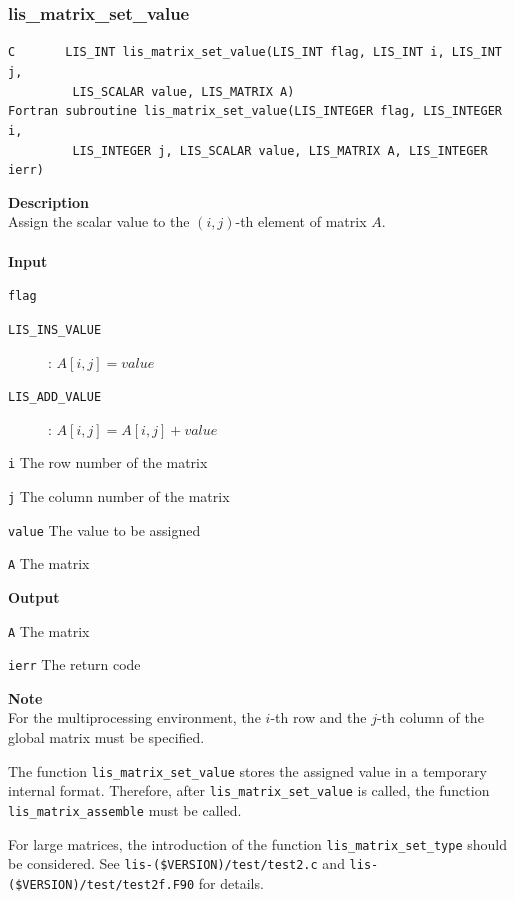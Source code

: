 \documentclass[a4paper]{article}
\newcommand{\namelistlabel}[1]{\mbox{#1}\hfill}
\newenvironment{namelist}[1]{%
\begin{list}{}
  {\let\makelabel\namelistlabel
  \settowidth{\labelwidth}{#1}
  \setlength{\leftmargin}{1.1\labelwidth}}
  }{%
\end{list}}
\begin{document}
\subsubsection{lis\_matrix\_set\_value}
\begin{screen}
\verb|C       LIS_INT lis_matrix_set_value(LIS_INT flag, LIS_INT i, LIS_INT j,|\\
\verb|         LIS_SCALAR value, LIS_MATRIX A)|\\
\verb|Fortran subroutine lis_matrix_set_value(LIS_INTEGER flag, LIS_INTEGER i,|\\
\verb|         LIS_INTEGER j, LIS_SCALAR value, LIS_MATRIX A, LIS_INTEGER ierr)|
\end{screen}
{\bf Description}\\
\indent
Assign the scalar value to the $(i, j)$-th element of matrix $A$.
\\ \\
\noindent
{\bf Input}
\begin{namelist}{XXXXXXXXXXXXXXXXXXXX}
\item[\tt flag] \begin{description}
\item[\tt LIS\_INS\_VALUE]: $A[i,j] = value$
\item[\tt LIS\_ADD\_VALUE]: $A[i,j] = A[i,j] + value$
\end{description}
\item[\tt i] The row number of the matrix
\item[\tt j] The column number of the matrix
\item[\tt value] The value to be assigned
\item[\tt A] The matrix
\end{namelist}
{\bf Output}
\begin{namelist}{XXXXXXXXXXXXXXXXXXXX}
\item[\tt A] The matrix 
\item[\tt ierr] The return code
\end{namelist}
\noindent
{\bf Note}\\
\indent
For the multiprocessing environment, the $i$-th row and the $j$-th column of the global matrix must 
be specified. 

The function \verb|lis_matrix_set_value| stores the assigned value in a temporary internal format. 
Therefore, after \verb|lis_matrix_set_value| is called, 
the function \verb|lis_matrix_assemble| must be called.

For large matrices, the introduction of the function \verb|lis_matrix_set_type|
should be considered. See {\tt lis-(\$VERSION)/test/test2.c} and
{\tt lis-(\$VERSION)/test/test2f.F90} for details.
\end{document}
